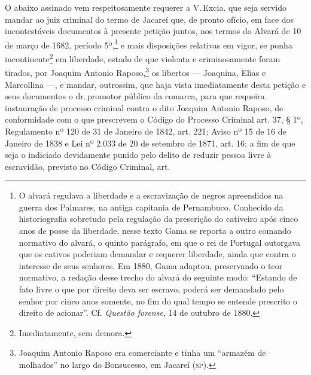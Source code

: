 O abaixo assinado vem respeitosamente requerer a V.\,Excia. que seja
servido mandar ao juiz criminal do termo de Jacareí que, de pronto
ofício, em face dos incontestáveis documentos à presente petição juntos,
nos termos do Alvará de 10 de março de 1682, período 5º,\footnote{ O
  alvará regulava a liberdade e a escravização de negros apreendidos na
  guerra dos Palmares, na antiga capitania de Pernambuco. Conhecido da
  historiografia sobretudo pela regulação da prescrição do cativeiro
  após cinco anos de posse da liberdade, nesse texto Gama se reporta a
  outro comando normativo do alvará, o quinto parágrafo, em que o rei de
  Portugal outorgava que os cativos poderiam demandar e requerer
  liberdade, ainda que contra o interesse de seus senhores. Em 1880,
  Gama adaptou, preservando o teor normativo, a redação desse trecho do
  alvará do seguinte modo: ``Estando de fato livre o que por direito deva
  ser escravo, poderá ser demandado pelo senhor por cinco anos somente,
  no fim do qual tempo se entende prescrito o direito de acionar''. Cf.
  \emph{Questão forense}, 14 de outubro de 1880.} e mais disposições relativas em
vigor, se ponha incontinente\footnote{ Imediatamente, sem demora.} em
liberdade, estado de que violenta e criminosamente foram tirados, por
Joaquim Antonio Raposo,\footnote{ Joaquim Antonio Raposo era
  comerciante e tinha um ``armazém de molhados'' no largo do Bonsucesso,
  em Jacareí (\textsc{sp}).} os libertos --- Joaquina, Elias e Marcollina ---, e
mandar, outrossim, que haja vista imediatamente desta petição e seus
documentos o dr.\,promotor público da comarca, para que requeira
instauração de processo criminal contra o dito Joaquim Antonio Raposo,
de conformidade com o que prescrevem o Código do Processo Criminal art.
37, § 1º, Regulamento nº 120 de 31 de Janeiro de 1842, art. 221; Aviso
nº 15 de 16 de Janeiro de 1838 e Lei nº 2.033 de 20 de setembro de 1871,
art. 16; a fim de que seja o indiciado devidamente punido pelo delito de
reduzir pessoa livre à escravidão, previsto no Código Criminal, art.
